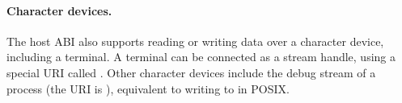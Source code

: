 



\paragraph{Character devices.}
The host ABI also supports reading or writing data over a character device, including a terminal.
A terminal can be connected as a stream handle,
using a special URI called .
Other character devices include the debug stream of a process (the URI is ),
equivalent to writing to  in POSIX.




